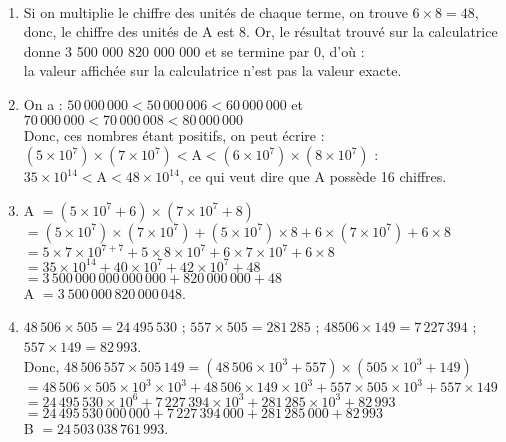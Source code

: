 \ \\ [-5mm]
   \begin{enumerate}
      \item Si on multiplie le chiffre des unités de chaque terme, on trouve $6\times8 =48$, donc, le chiffre des unités de A est 8. Or, le résultat trouvé sur la calculatrice donne 3 500 000 820 000 000 et se termine par 0, d'où : \\
         {\blue la valeur affichée sur la calculatrice n'est pas la valeur exacte}.
      \item On a : $50\,000\,000<50\,000\,006<60\,000\,000$ et $70\,000\,000<70\,000\,008<80\,000\,000$ \\
         Donc, ces nombres étant positifs, on peut écrire :$(5\times10^7)\times(7\times10^7)<\text{A}<(6\times10^7)\times(8\times10^7)$ : \\
         {\blue $35\times10^{14} < \text{A} < 48\times10^{14}$}, ce qui veut dire que {\blue A possède 16 chiffres}.
      \item A $=(5 \times 10^7+6)\times(7\times10^7+8)$ \\
         \hspace*{0.7cm} $=(5\times10^7)\times(7\times10^7)+(5\times10^7)\times8+6\times(7\times10^7)+6\times8$ \\
         \hspace*{0.7cm} $=5\times7\times10^{7+7}+5\times8\times10^7+6\times7\times10^7+6\times8$ \\
         \hspace*{0.7cm} $=35\times10^{14}+40\times10^7+42\times10^{7}+48$ \\
         \hspace*{0.7cm} $=3\,500\,000\,000\,000\,000+820\,000\,000+48$ \\
         {\blue A $=3\ 500\,000\,820\,000\,048$.}
      \item $48\,506\times505 =24\,495\,530$ \qquad ; \qquad $557\times505 =281\,285$ \qquad ; \qquad $48 506\times149 =7\,227\,394$ \qquad ; \qquad $557\times149 =82\,993$. \\
       Donc, $48\,506\,557\times505\,149 =(48\,506\times10^3+557)\times(505\times10^3+149)$ \\
         \hspace*{3.85cm} $=48\,506\times505\times10^3\times10^3+48\,506\times149\times10^3+557\times505\times10^3+557\times149$ \\
         \hspace*{3.85cm} $=24\,495\,530\times10^6+7\,227\,394\times10^3+281\,285\times10^3+82\,993$ \\
         \hspace*{3.85cm} $=24\,495\,530\,000\,000+7\,227\,394\,000+281\,285\,000+82\,993$ \\
         { \blue B $=24\,503\,038\,761\,993$}.
   \end{enumerate}
